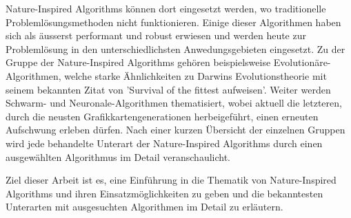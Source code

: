 % 
% 
%
Nature-Inspired Algorithms können dort eingesetzt werden, wo traditionelle
Problemlösungsmethoden nicht funktionieren. Einige dieser Algorithmen haben
sich als äusserst performant und robust erwiesen und werden heute zur Problemlösung
in den unterschiedlichsten Anwedungsgebieten eingesetzt. Zu der Gruppe der Nature-Inspired
Algorithms gehören beispielsweise Evolutionäre-Algorithmen, welche starke Ähnlichkeiten zu
Darwins Evolutionstheorie mit seinem bekannten Zitat von 'Survival of the fittest aufweisen'.
Weiter werden Schwarm- und Neuronale-Algorithmen thematisiert, wobei aktuell die letzteren,
durch die neusten Grafikkartengenerationen herbeigeführt, einen erneuten Aufschwung erleben
dürfen. Nach einer kurzen Übersicht der einzelnen Gruppen wird jede behandelte Unterart der
Nature-Inspired Algorithms durch einen ausgewählten Algorithmus im Detail veranschaulicht.

Ziel dieser Arbeit ist es, eine Einführung in die Thematik von Nature-Inspired Algorithms und ihren
Einsatzmöglichkeiten zu geben und die bekanntesten Unterarten mit ausgesuchten Algorithmen im Detail
zu erläutern.
